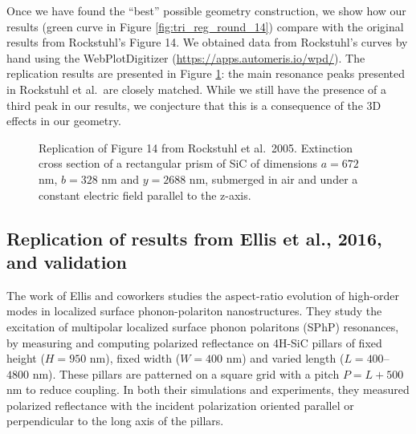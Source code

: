 Once we have found the ``best'' possible geometry construction, we show how our results 
(green curve in Figure \ref{fig:tri_reg_round_14}) compare 
with the original results from Rockstuhl's Figure 14. We obtained data from Rockstuhl's curves by hand using 
the WebPlotDigitizer (\url{https://apps.automeris.io/wpd/}). The replication results are 
presented in Figure \ref{fig:rep_14}: the main resonance peaks presented in Rockstuhl et al.\ are 
closely matched. While we still have the presence of a third peak in our results, we conjecture 
that this is a consequence of the 3D effects in our geometry.

 \begin{figure}
    \centering
    \caption{Replication of Figure 14 from Rockstuhl et al.\ 2005. Extinction cross section of a
    rectangular prism of SiC of dimensions $a=672$ nm, $b=328$ nm and $y=2688$ nm, submerged
    in air and under a constant electric field parallel to the z-axis.}
    \label{fig:rep_14}
 \end{figure}


 \subsection{Replication of results from Ellis et al., 2016, and validation}

The work of Ellis and coworkers \cite{ellis2016} studies the aspect-ratio evolution of high-order
modes in localized surface phonon-polariton nanostructures. They study the
excitation of multipolar localized surface phonon polaritons (SPhP) resonances, by measuring
and computing polarized reflectance on 4H-SiC pillars of fixed height ($H=950$ nm), fixed 
width ($W=400$ nm) and varied length ($L=400$--$4800$ nm). These pillars are patterned on a square 
grid with a pitch $P=L+500$ nm to reduce coupling. In both their simulations and experiments, they 
measured polarized reflectance with the incident polarization 
oriented parallel or perpendicular to the long axis of the pillars.  

